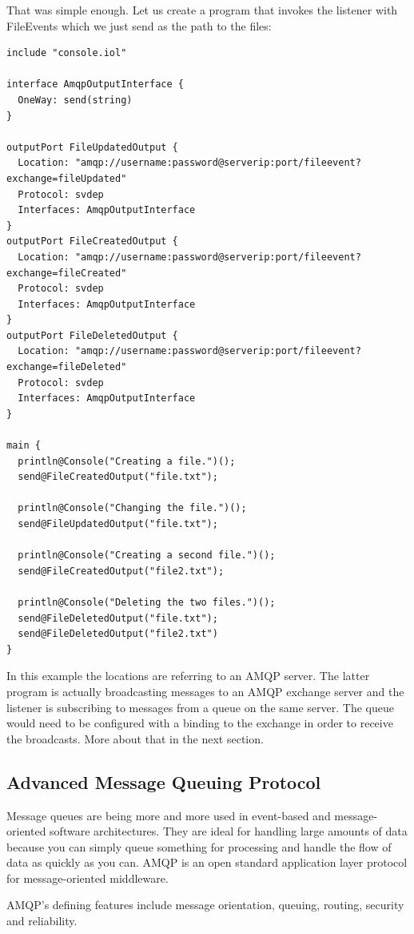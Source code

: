 That was simple enough. Let us create a program that invokes the listener with FileEvents which we just send as the path to the files:

\begin{lstlisting}
include "console.iol"

interface AmqpOutputInterface {
  OneWay: send(string)
}

outputPort FileUpdatedOutput {
  Location: "amqp://username:password@serverip:port/fileevent?exchange=fileUpdated"
  Protocol: svdep
  Interfaces: AmqpOutputInterface
}
outputPort FileCreatedOutput {
  Location: "amqp://username:password@serverip:port/fileevent?exchange=fileCreated"
  Protocol: svdep
  Interfaces: AmqpOutputInterface
}
outputPort FileDeletedOutput {
  Location: "amqp://username:password@serverip:port/fileevent?exchange=fileDeleted"
  Protocol: svdep
  Interfaces: AmqpOutputInterface
}

main {
  println@Console("Creating a file.")();
  send@FileCreatedOutput("file.txt");

  println@Console("Changing the file.")();
  send@FileUpdatedOutput("file.txt");

  println@Console("Creating a second file.")();
  send@FileCreatedOutput("file2.txt");

  println@Console("Deleting the two files.")();
  send@FileDeletedOutput("file.txt");
  send@FileDeletedOutput("file2.txt")
}
\end{lstlisting}

In this example the locations are referring to an AMQP server. The latter program is actually broadcasting messages to an AMQP exchange server and the listener is subscribing to messages from a queue on the same server. The queue would need to be configured with a binding to the exchange in order to receive the broadcasts. More about that in the next section.
\subsection{Advanced Message Queuing Protocol}
Message queues are being more and more used in event-based and message-oriented software architectures. They are ideal for handling large amounts of data because you can simply queue something for processing and handle the flow of data as quickly as you can. AMQP\cite{AMQP} is an open standard application layer protocol for message-oriented middleware.

AMQP's defining features include message orientation, queuing, routing, security and reliability.

